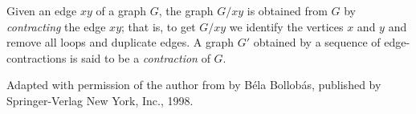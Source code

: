 \documentclass[12pt]{article}
\begin{document}
Given an edge $xy$ of a graph $G$, the graph $G/xy$ is obtained from $G$ by \emph{contracting} the edge $xy$; that is, to get $G/xy$ we identify the vertices $x$ and $y$ and remove all loops and duplicate edges. A graph $G'$ obtained by a sequence of edge-contractions is said to be a \emph{contraction} of $G$.


\footnotesize{Adapted with permission of the author from \emph{} by B\'{e}la Bollob\'{a}s, published by Springer-Verlag New York, Inc., 1998.}
\end{document}

